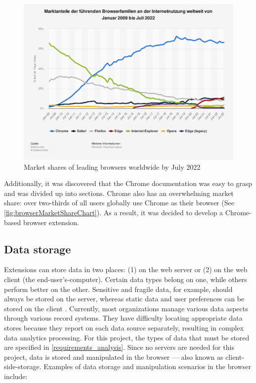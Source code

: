 \begin{figure}[H]
  \includegraphics[width=\textwidth]{assets/statistic_id157944_marktanteile-fuehrender-browser-weltweit-bis-juli-2022.png}
  \caption{Market shares of leading browsers worldwide by July 2022}
  \label{fig:browserMarketShareChart}
\end{figure}

Additionally, it was discovered that the Chrome documentation was easy to grasp and was divided up into sections. Chrome also has an overwhelming market share: over two-thirds of all users globally use Chrome as their browser (See \autoref{fig:browserMarketShareChart}). As a result, it was decided to develop a Chrome-based browser extension.

\subsection{Data storage}
Extensions can store data in two places: (1) on the web server or (2) on the web client (the end-user's-computer). Certain data types belong on one, while others perform better on the other. Sensitive and fragile data, for example, should always be stored on the server, whereas static data and user preferences can be stored on the client \autocite{macdonald2013html5}. Currently, most organizations manage various data aspects through various record systems. They have difficulty locating appropriate data stores because they report on each data source separately, resulting in complex data analytics processing. For this project, the types of data that must be stored are specified in \autoref{requirements_analysis}. Since no servers are needed for this project, data is stored and manipulated in the browser --- also known as client-side-storage. Examples of data storage and manipulation scenarios in the browser include:

